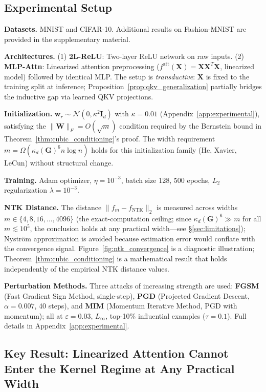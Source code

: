 \documentclass{article}
\theoremstyle{plain}
\theoremstyle{definition}
\theoremstyle{remark}
\begin{document}
\subsection{Experimental Setup}

\textbf{Datasets.} MNIST and CIFAR-10. Additional results on Fashion-MNIST are provided in the supplementary material.

\textbf{Architectures.} (1) \textbf{2L-ReLU}: Two-layer ReLU network on raw inputs. (2) \textbf{MLP-Attn}: Linearized attention preprocessing ($f^{\text{att}}(\mathbf{X}) = \mathbf{X}\mathbf{X}^T\mathbf{X}$, linearized model) followed by identical MLP. The setup is \emph{transductive}: $\mathbf{X}$ is fixed to the training split at inference; Proposition~\ref{prop:qkv_generalization} partially bridges the inductive gap via learned QKV projections.

\textbf{Initialization.} $\mathbf{w}_r \sim \mathcal{N}(0, \kappa^2 \mathbf{I}_d)$ with $\kappa = 0.01$ (Appendix~\ref{app:experimental}), satisfying the $\|\mathbf{W}\|_F = O(\sqrt{m})$ condition required by the Bernstein bound in Theorem~\ref{thm:cubic_conditioning}'s proof. The width requirement $m = \Omega(\kappa_d(\mathbf{G})^6 n \log n)$ holds for this initialization family (He, Xavier, LeCun) without structural change.

\textbf{Training.} Adam optimizer, $\eta = 10^{-3}$, batch size 128, 500 epochs, $L_2$ regularization $\lambda = 10^{-3}$.

\textbf{NTK Distance.} The distance $\|f_m - f_{\text{NTK}}\|_2$ is measured across widths $m \in \{4, 8, 16, \ldots, 4096\}$ (the exact-computation ceiling; since $\kappa_d(\mathbf{G})^6 \gg m$ for all $m \lesssim 10^5$, the conclusion holds at any practical width---see \S\ref{sec:limitations}); Nystr\"{o}m approximation is avoided because estimation error would conflate with the convergence signal. Figure~\ref{fig:ntk_convergence} is a diagnostic illustration; Theorem~\ref{thm:cubic_conditioning} is a mathematical result that holds independently of the empirical NTK distance values.

\textbf{Perturbation Methods.} Three attacks of increasing strength are used: \textbf{FGSM} (Fast Gradient Sign Method, single-step), \textbf{PGD} (Projected Gradient Descent, $\alpha=0.007$, 40 steps), and \textbf{MIM} (Momentum Iterative Method, PGD with momentum); all at $\varepsilon=0.03$, $L_\infty$, top-10\% influential examples ($\tau=0.1$). Full details in Appendix~\ref{app:experimental}.

\subsection{Key Result: Linearized Attention Cannot Enter the Kernel Regime at Any Practical Width}
\end{document}
